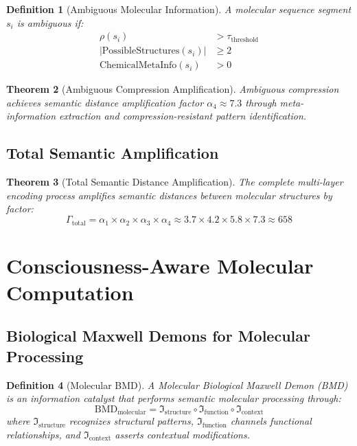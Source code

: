 \documentclass[12pt,a4paper]{article}
\newtheorem{theorem}{Theorem}[section]
\newtheorem{definition}[theorem]{Definition}
\begin{document}
\begin{definition}[Ambiguous Molecular Information]
A molecular sequence segment $s_i$ is ambiguous if:
\begin{align}
\rho(s_i) &> \tau_{\text{threshold}} \\
|\text{PossibleStructures}(s_i)| &\geq 2 \\
\text{ChemicalMetaInfo}(s_i) &> 0
\end{align}
\end{definition}

\begin{theorem}[Ambiguous Compression Amplification]
Ambiguous compression achieves semantic distance amplification factor $\alpha_4 \approx 7.3$ through meta-information extraction and compression-resistant pattern identification.
\end{theorem}

\subsection{Total Semantic Amplification}

\begin{theorem}[Total Semantic Distance Amplification]
The complete multi-layer encoding process amplifies semantic distances between molecular structures by factor:
\begin{equation}
\Gamma_{\text{total}} = \alpha_1 \times \alpha_2 \times \alpha_3 \times \alpha_4 \approx 3.7 \times 4.2 \times 5.8 \times 7.3 \approx 658
\end{equation}
\end{theorem}

\section{Consciousness-Aware Molecular Computation}

\subsection{Biological Maxwell Demons for Molecular Processing}

\begin{definition}[Molecular BMD]
A Molecular Biological Maxwell Demon (BMD) is an information catalyst that performs semantic molecular processing through:
\begin{equation}
\text{BMD}_{\text{molecular}} = \mathfrak{I}_{\text{structure}} \circ \mathfrak{I}_{\text{function}} \circ \mathfrak{I}_{\text{context}}
\end{equation}
where $\mathfrak{I}_{\text{structure}}$ recognizes structural patterns, $\mathfrak{I}_{\text{function}}$ channels functional relationships, and $\mathfrak{I}_{\text{context}}$ asserts contextual modifications.
\end{definition}
\end{document}
